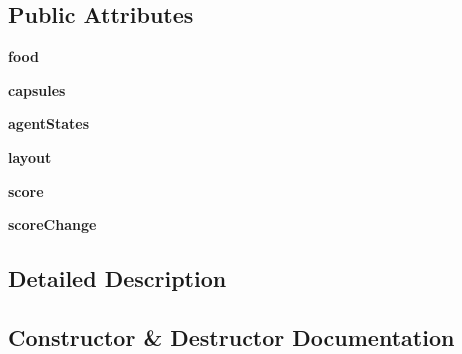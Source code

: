 \subsection*{Public Attributes}
\begin{DoxyCompactItemize}
\item 
\mbox{\label{classgame_1_1_game_state_data_a72692e981c3acf8b6d47d6799b3ecb4d}} 
{\bfseries food}
\item 
\mbox{\label{classgame_1_1_game_state_data_ae3e71a93e64a513844678e0eafdb4480}} 
{\bfseries capsules}
\item 
\mbox{\label{classgame_1_1_game_state_data_a82eaddd308ad641a76f957597141d4c9}} 
{\bfseries agent\+States}
\item 
\mbox{\label{classgame_1_1_game_state_data_a7c372b6ff85915c7507b036c54b6e0d7}} 
{\bfseries layout}
\item 
\mbox{\label{classgame_1_1_game_state_data_aadc0d8d56eccd6ea8f9987d9ffc0bba7}} 
{\bfseries score}
\item 
\mbox{\label{classgame_1_1_game_state_data_af564ae05c2feb60aa3ee96465c74a8bf}} 
{\bfseries score\+Change}
\end{DoxyCompactItemize}


\subsection{Detailed Description}
\begin{DoxyVerb}\end{DoxyVerb}
 

\subsection{Constructor \& Destructor Documentation}
\mbox{\label{classgame_1_1_game_state_data_a764ef0d670ccef7010e70f95481ee80f}} 
